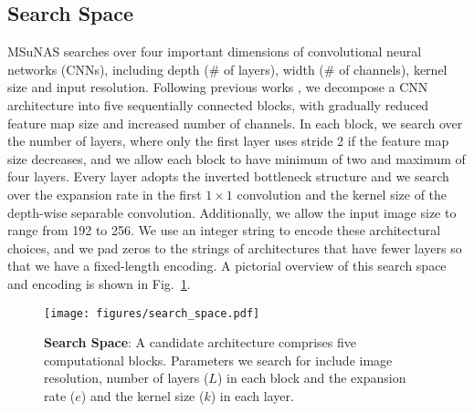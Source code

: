 \documentclass[runningheads]{llncs}
\def\ourmethod{MSuNAS}
\begin{document}
\subsection{Search Space}
\ourmethod{} searches over four important dimensions of convolutional neural networks (CNNs), including depth (\# of layers), width (\# of channels), kernel size and input resolution. Following previous works \cite{mnasnet,mobilenetv3,onceforall}, we decompose a CNN architecture into five sequentially connected blocks, with gradually reduced feature map size and increased number of channels. In each block, we search over the number of layers, where only the first layer uses stride 2 if the feature map size decreases, and we allow each block to have minimum of two and maximum of four layers. Every layer adopts the inverted bottleneck structure \cite{mobilenetv2} and we search over the expansion rate in the first $1\times1$ convolution and the kernel size of the depth-wise separable convolution. Additionally, we allow the input image size to range from 192 to 256. We use an integer string to encode these architectural choices, and we pad zeros to the strings of architectures that have fewer layers so that we have a fixed-length encoding. A pictorial overview of this search space and encoding is shown in Fig.~\ref{fig:search_space}.

\begin{figure}[t]
    \centering
    \texttt{[image: figures/search\_space.pdf]}
    \caption{\textbf{Search Space}: A candidate architecture comprises five computational blocks. Parameters we search for include image resolution, number of layers ($L$) in each block and the expansion rate ($e$) and the kernel size ($k$) in each layer.
    \label{fig:search_space}}
\end{figure}
\end{document}
